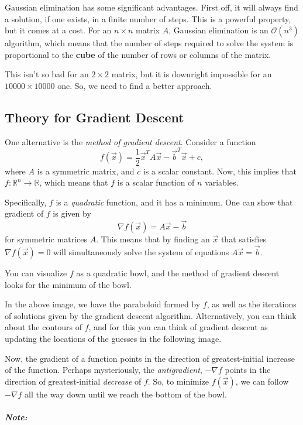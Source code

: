 \documentclass{article}
\begin{document}
Gaussian elimination has some significant advantages. First off, it will
always find a solution, if one exists, in a finite number of steps. This
is a powerful property, but it comes at a cost. For an $n\times n$
matrix $A$, Gaussian elimination is an $\mathcal{O}(n^3)$ algorithm,
which means that the number of steps required to solve the system is
proportional to the \textbf{cube} of the number of rows or columns of
the matrix.

This isn't so bad for an $2\times 2$ matrix, but it is downright
impossible for an $10000\times 10000$ one. So, we need to find a better
approach.

\subsection{Theory for Gradient
Descent}\label{theory-for-gradient-descent}

One alternative is the \emph{method of gradient descent}. Consider a
function
\[f(\vec{x})=\frac{1}{2}\vec{x}^T A \vec{x} - \vec{b}^T\vec{x} + c,\]
where $A$ is a symmetric matrix, and $c$ is a scalar constant. Now, this
implies that $f : \mathbb{R}^n \to \mathbb{R}$, which means that $f$ is
a scalar function of $n$ variables.

Specifically, $f$ is a \emph{quadratic} function, and it has a minimum.
One can show that gradient of $f$ is given by
\[ \nabla f(\vec{x}) = A\vec{x} - \vec{b}\] for symmetric matrices $A$.
This means that by finding an $\vec{x}$ that satisfies
$\nabla f(\vec{x})=0$ will simultaneously solve the system of equations
$A\vec{x}=\vec{b}$.

You can visualize $f$ as a quadratic bowl, and the method of gradient
descent looks for the minimum of the bowl.

In the above image, we have the paraboloid formed by $f$, as well as the
iterations of solutions given by the gradient descent algorithm.
Alternatively, you can think about the contours of $f$, and for this you
can think of gradient descent as updating the locations of the guesses
in the following image.

Now, the gradient of a function points in the direction of
greatest-initial increase of the function. Perhaps mysteriously, the
\emph{antigradient}, $-\nabla f$ points in the direction of
greatest-initial \emph{decrease} of $f$. So, to minimize $f(\vec{x})$,
we can follow $-\nabla f$ all the way down until we reach the bottom of
the bowl.

\subparagraph{Note:}\label{note}
\end{document}

